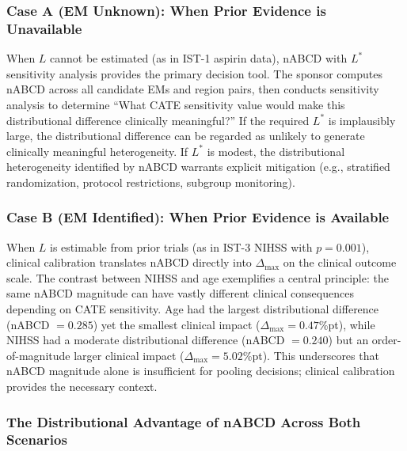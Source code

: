 \documentclass[AMA,Times1COL]{WileyNJDv5}
\begin{document}
\subsubsection*{Case A (EM Unknown): When Prior Evidence is Unavailable}

When $L$ cannot be estimated (as in IST-1 aspirin data), nABCD with $L^*$ sensitivity analysis provides the primary decision tool. The sponsor computes nABCD across all candidate EMs and region pairs, then conducts sensitivity analysis to determine ``What CATE sensitivity value would make this distributional difference clinically meaningful?'' If the required $L^*$ is implausibly large, the distributional difference can be regarded as unlikely to generate clinically meaningful heterogeneity. If $L^*$ is modest, the distributional heterogeneity identified by nABCD warrants explicit mitigation (e.g., stratified randomization, protocol restrictions, subgroup monitoring).

\subsubsection*{Case B (EM Identified): When Prior Evidence is Available}

When $L$ is estimable from prior trials (as in IST-3 NIHSS with $p = 0.001$), clinical calibration translates nABCD directly into $\Delta_{\max}$ on the clinical outcome scale. The contrast between NIHSS and age exemplifies a central principle: the same nABCD magnitude can have vastly different clinical consequences depending on CATE sensitivity. Age had the largest distributional difference (nABCD $= 0.285$) yet the smallest clinical impact ($\Delta_{\max} = 0.47$\%pt), while NIHSS had a moderate distributional difference (nABCD $= 0.240$) but an order-of-magnitude larger clinical impact ($\Delta_{\max} = 5.02$\%pt). This underscores that nABCD magnitude alone is insufficient for pooling decisions; clinical calibration provides the necessary context.

\subsubsection*{The Distributional Advantage of nABCD Across Both Scenarios}
\end{document}

